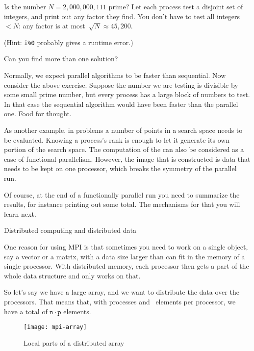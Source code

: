 \begin{exercise}
  \label{ex:primetest}
  Is the number $N=2,000,000,111$ prime?  Let each process test a
  disjoint set of integers, and print out any factor they find.  You don't
  have to test all integers~$<N$: any factor is at
  most~$\sqrt N\approx 45,200$.

  (Hint: \verb+i%0+ probably gives a runtime error.)

  Can you find more than one solution?
\end{exercise}

\begin{remark}
  Normally, we expect parallel algorithms to be faster than sequential.
  Now consider the above exercise. Suppose the number we are testing
  is divisible by some small prime number, but every process has a
  large block of numbers to test. In that case the sequential algorithm would
  have been faster than the parallel one. Food for thought.
\end{remark}

As another example, in  problems
a number of points in a search space needs to be evaluated. Knowing
a process's rank is enough to let it generate its own portion of the
search space. The computation of the  can
also be considered as a case of functional parallelism. However, the
image that is constructed is data that needs to be kept on one
processor, which breaks the symmetry of the parallel run.

Of course, at the end of a functionally parallel run you need to
summarize the results, for instance printing out some total.
The mechanisms for that you will learn next.

 {Distributed computing and distributed data}
\label{sec:distributed-array}

One reason for using MPI is that sometimes you need to work on
a single object,
say a vector or a matrix,
with a  data size larger than can fit in the memory of a single processor.
With distributed memory, each processor then gets a part
of the whole data structure and only works on that.

So let's say we have a large array, and we want to
distribute the data over the processors.
That means that, with  processes and ~elements
per processor, we have a total of $\mathtt{n}\cdot\mathtt{p}$
elements.

\begin{figure}[ht]
  \texttt{[image: mpi-array]}
  \caption{Local parts of a distributed array}
  \label{fig:mpi-array}
\end{figure}

